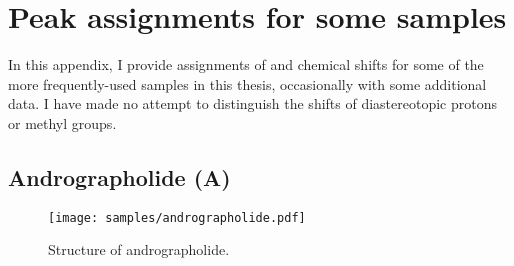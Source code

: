 \chapter{Peak assignments for some samples}
\label{chpt:assignments}

In this appendix, I provide assignments of \proton{} and \carbon{} chemical shifts for some of the more frequently-used samples in this thesis, occasionally with some additional data.
I have made no attempt to distinguish the shifts of diastereotopic protons or methyl groups.

\clearpage 

\section{Andrographolide (A)}

\begin{figure}[!ht]
    \centering
    \texttt{[image: samples/andrographolide.pdf]}%
    \caption[Structure of andrographolide]{
        Structure of andrographolide.
    }
    \label{fig:samples_andrographolide}
\end{figure}

